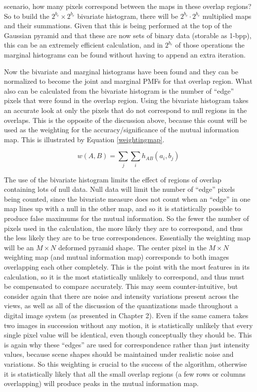 scenario, how many pixels correspond between the maps in these overlap regions? So to build the $2^{b_{e}} \times 2^{b_{e}}$ bivariate histogram, there will be $2^{b_{e}} \cdot 2^{b_{e}}$ multiplied maps and their summations. Given that this is being performed at the top of the Gaussian pyramid and that these are now sets of binary data (storable as 1-bpp), this can be an extremely efficient calculation, and in $2^{b_{e}}$ of those operations the marginal histograms can be found without having to append an extra iteration.

Now the bivariate and marginal histograms have been found and they can be normalized to become the joint and marginal PMFs for that overlap region. What also can be calculated from the bivariate histogram is the number of ``edge'' pixels that were found in the overlap region. Using the bivariate histogram takes an accurate look at only the pixels that do not correspond to null regions in the overlaps. This is the opposite of the discussion above, because this count will be used as the weighting for the accuracy/significance of the mutual information map. This is illustrated by Equation \ref{weightingmap}.

\begin{equation}
\label{weightingmap}
w(A,B)=\sum_{j}\sum_{i}{h_{AB}(a_{i},b_{j})}
\end{equation}

\noindent The use of the bivariate histogram limits the effect of regions of overlap containing lots of null data. Null data will limit the number of ``edge'' pixels being counted, since the bivariate measure does not count when an ``edge'' in one map lines up with a null in the other map, and so it is statistically possible to produce false maximums for the mutual information. So the fewer the number of pixels used in the calculation, the more likely they are to correspond, and thus the less likely they are to be true correspondences. Essentially the weighting map will be an $M \times N$ deformed pyramid shape. The center pixel in the $M \times N$ weighting map (and mutual information map) corresponds to both images overlapping each other completely. This is the point with the most features in its calculation, so it is the most statistically unlikely to correspond, and thus must be compensated to compare accurately. This may seem counter-intuitive, but consider again that there are noise and intensity variations present across the views, as well as all of the discussion of the quantizations made throughout a digital image system (as presented in Chapter 2). Even if the same camera takes two images in succession without any motion, it is statistically unlikely that every single pixel value will be identical, even though conceptually they should be. This is again why these ``edges'' are used for correspondence rather than just intensity values, because scene shapes should be maintained under realistic noise and variations. So this weighting is crucial to the success of the algorithm, otherwise it is statistically likely that all the small overlap regions (a few rows or columns overlapping) will produce peaks in the mutual information map.

